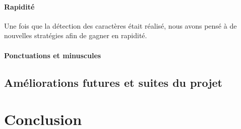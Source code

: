 \documentclass[a4paper,12pt,titlepage]{report}
\begin{document}
	\paragraph{Rapidité}
	
	Une fois que la détection des caractères était réalisé, nous avons pensé à de nouvelles stratégies afin de gagner en rapidité.
	
	
	\paragraph{Ponctuations et minuscules}
	\subsection{Améliorations futures et suites du projet}	
	\section{Conclusion}
	
\end{document}
